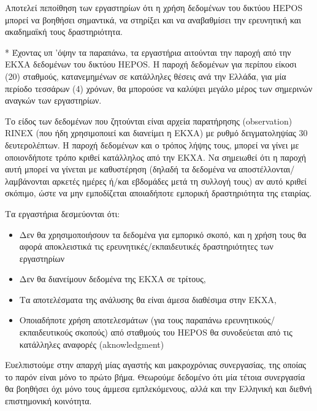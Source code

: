 \documentclass[11pt]{article}
\begin{document}
Αποτελεί πεποίθηση των εργαστηρίων ότι η χρήση δεδομένων του δικτύου HEPOS μπορεί να βοηθήσει σημαντικά, να στηρίξει και να αναβαθμίσει την ερευνητική και ακαδημαϊκή τους δραστηριότητα.

\vspace{0.5cm}
*%
Έχοντας υπ 'όψην τα παραπάνω, τα εργαστήρια αιτούνται την παροχή από την ΕΚΧΑ δεδομένων του δικτύου HEPOS. Η παροχή δεδομένων για περίπου είκοσι (20) σταθμούς, κατανεμημένων σε κατάλληλες θέσεις ανά την Ελλάδα, για μία περίοδο τεσσάρων (4) χρόνων, θα μπορούσε να καλύψει μεγάλο μέρος των σημερινών αναγκών των εργαστηρίων.

Το είδος των δεδομένων που ζητούνται είναι αρχεία παρατήρησης (observation) RINEX (που ήδη χρησιμοποιεί και διανείμει η ΕΚΧΑ) με ρυθμό δειγματοληψίας 30 δευτερολέπτων. Η παροχή δεδομένων και ο τρόπος λήψης τους, μπορεί να γίνει με οποιονδήποτε τρόπο κριθεί κατάλληλος από την ΕΚΧΑ. Να σημειωθεί ότι η παροχή αυτή μπορεί να γίνεται με καθυστέρηση (δηλαδή τα δεδομένα να αποστέλλονται/λαμβάνονται αρκετές ημέρες ή/και εβδομάδες μετά τη συλλογή τους) αν αυτό κριθεί σκόπιμο, ώστε να μην εμποδίζεται αποιαδήποτε εμπορική δραστηριότητα της εταιρίας.

Τα εργαστήρια δεσμεύονται ότι:
\begin{itemize}
\item Δεν θα χρησιμοποιήσουν τα δεδομένα για εμπορικό σκοπό, και η χρήση τους θα αφορά αποκλειστικά τις ερευνητικές/εκπαιδευτικές δραστηριότητες των εργαστηρίων
\item Δεν θα διανείμουν δεδομένα της ΕΚΧΑ σε τρίτους,
\item Τα αποτελέσματα της ανάλυσης θα είναι άμεσα διαθέσιμα στην ΕΚΧΑ,
\item Οποιαδήποτε χρήση αποτελεσμάτων (για τους παραπάνω ερευνητικούς/εκπαιδευτικούς σκοπούς) από σταθμούς του HEPOS θα συνοδεύεται από τις κατάλληλες αναφορές (aknowledgment)
\end{itemize}

Ευελπιστούμε στην απαρχή μίας αγαστής και μακροχρόνιας συνεργασίας, της οποίας το παρόν είναι μόνο το πρώτο βήμα. Θεωρούμε δεδομένο ότι μία τέτοια συνεργασία θα βοηθήσει όχι μόνο τους άμμεσα εμπλεκόμενους, αλλά και την Ελληνική και διεθνή επιστημονική κοινότητα.




\end{document}
